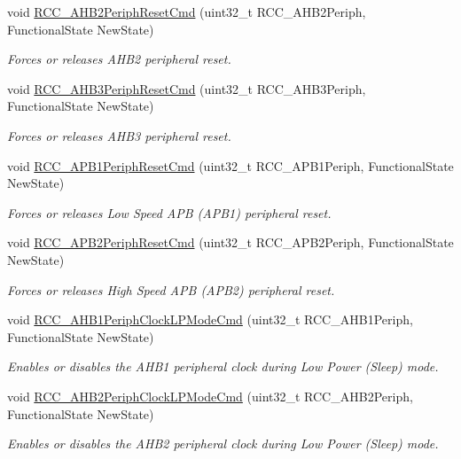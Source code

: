 \begin{DoxyCompactItemize}
void \hyperlink{group___r_c_c_gafb119d6d1955d1b8c361e8140845ac5a}{R\+C\+C\+\_\+\+A\+H\+B2\+Periph\+Reset\+Cmd} (uint32\+\_\+t R\+C\+C\+\_\+\+A\+H\+B2\+Periph, Functional\+State New\+State)
\begin{DoxyCompactList}\small\item\em Forces or releases A\+H\+B2 peripheral reset. \end{DoxyCompactList}\item 
void \hyperlink{group___r_c_c_gaee44f159a1ca9ebdd7117bff387cd592}{R\+C\+C\+\_\+\+A\+H\+B3\+Periph\+Reset\+Cmd} (uint32\+\_\+t R\+C\+C\+\_\+\+A\+H\+B3\+Periph, Functional\+State New\+State)
\begin{DoxyCompactList}\small\item\em Forces or releases A\+H\+B3 peripheral reset. \end{DoxyCompactList}\item 
void \hyperlink{group___r_c_c_gab197ae4369c10b92640a733b40ed2801}{R\+C\+C\+\_\+\+A\+P\+B1\+Periph\+Reset\+Cmd} (uint32\+\_\+t R\+C\+C\+\_\+\+A\+P\+B1\+Periph, Functional\+State New\+State)
\begin{DoxyCompactList}\small\item\em Forces or releases Low Speed A\+PB (A\+P\+B1) peripheral reset. \end{DoxyCompactList}\item 
void \hyperlink{group___r_c_c_gad94553850ac07106a27ee85fec37efdf}{R\+C\+C\+\_\+\+A\+P\+B2\+Periph\+Reset\+Cmd} (uint32\+\_\+t R\+C\+C\+\_\+\+A\+P\+B2\+Periph, Functional\+State New\+State)
\begin{DoxyCompactList}\small\item\em Forces or releases High Speed A\+PB (A\+P\+B2) peripheral reset. \end{DoxyCompactList}\item 
void \hyperlink{group___r_c_c_ga5cd0d5adbc7496d7005b208bd19ce255}{R\+C\+C\+\_\+\+A\+H\+B1\+Periph\+Clock\+L\+P\+Mode\+Cmd} (uint32\+\_\+t R\+C\+C\+\_\+\+A\+H\+B1\+Periph, Functional\+State New\+State)
\begin{DoxyCompactList}\small\item\em Enables or disables the A\+H\+B1 peripheral clock during Low Power (Sleep) mode. \end{DoxyCompactList}\item 
void \hyperlink{group___r_c_c_ga1ac5bb9676ae9b48e50d6a95de922ce3}{R\+C\+C\+\_\+\+A\+H\+B2\+Periph\+Clock\+L\+P\+Mode\+Cmd} (uint32\+\_\+t R\+C\+C\+\_\+\+A\+H\+B2\+Periph, Functional\+State New\+State)
\begin{DoxyCompactList}\small\item\em Enables or disables the A\+H\+B2 peripheral clock during Low Power (Sleep) mode. \end{DoxyCompactList}\item 

\end{DoxyCompactItemize}
